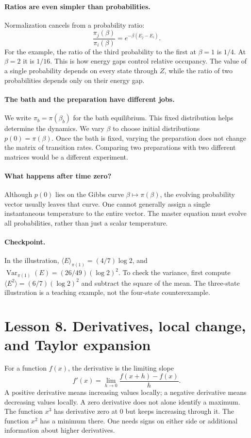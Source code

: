 \documentclass[11pt]{article}
\newcommand{\Var}{\operatorname{Var}}
\begin{document}
\paragraph{Ratios are even simpler than probabilities.}
Normalization cancels from a probability ratio:
\[
\frac{\pi_j(\beta)}{\pi_i(\beta)}
=e^{-\beta(E_j-E_i)}.
\]
For the example, the ratio of the third probability to the first at $\beta=1$
is $1/4$. At $\beta=2$ it is $1/16$. This is how energy gaps control relative
occupancy. The value of a single probability depends on every state through
$Z$, while the ratio of two probabilities depends only on their energy gap.

\paragraph{The bath and the preparation have different jobs.}
We write $\pi_b=\pi(\beta_b)$ for the bath equilibrium. This fixed distribution
helps determine the dynamics. We vary $\beta$ to choose initial distributions
$p(0)=\pi(\beta)$. Once the bath is fixed, varying the preparation does not
change the matrix of transition rates. Comparing two preparations with two
different matrices would be a different experiment.

\paragraph{What happens after time zero?}
Although $p(0)$ lies on the Gibbs curve $\beta\mapsto\pi(\beta)$, the evolving
probability vector usually leaves that curve. One cannot generally assign a
single instantaneous temperature to the entire vector. The master equation
must evolve all probabilities, rather than just a scalar temperature.

\paragraph{Checkpoint.}
In the illustration,
$\langle E\rangle_{\pi(1)}=(4/7)\log2$, and
$\Var_{\pi(1)}(E)=(26/49)(\log2)^2$. To check the variance, first compute
$\langle E^2\rangle=(6/7)(\log2)^2$ and subtract the square of the mean.
The three-state illustration is a teaching example, not the four-state
counterexample.

\clearpage
\section*{Lesson 8. Derivatives, local change, and Taylor expansion}
For a function $f(x)$, the derivative is the limiting slope
\[
f'(x)=\lim_{h\to0}\frac{f(x+h)-f(x)}{h}.
\]
A positive derivative means increasing values locally; a negative derivative
means decreasing values locally. A zero derivative does not alone identify a
maximum. The function $x^3$ has derivative zero at $0$ but keeps increasing
through it. The function $x^2$ has a minimum there. One needs signs on either
side or additional information about higher derivatives.
\end{document}
